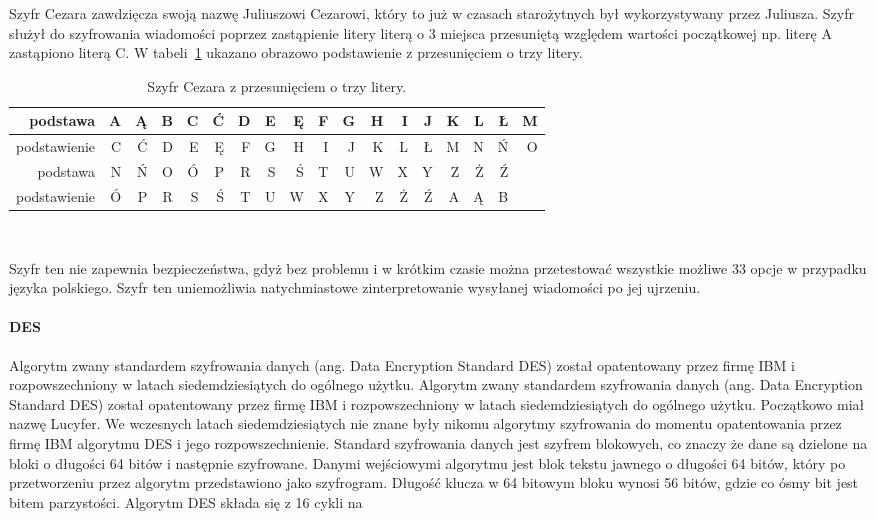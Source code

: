 \documentclass[12p]{article}
\begin{document}
Szyfr Cezara zawdzięcza swoją nazwę Juliuszowi Cezarowi, który to już w czasach starożytnych był wykorzystywany przez Juliusza. Szyfr służył do szyfrowania wiadomości poprzez zastąpienie litery literą o 3 miejsca przesuniętą względem wartości początkowej np. literę A zastąpiono literą C. W tabeli~\ref{cezar} ukazano obrazowo podstawienie z przesunięciem o trzy litery.

\begin{table}[!h]
\centering
\begin{tabular}{|r|r|r|r|r|r|r|r|r|r|r|r|r|r|r|r|r|r|}
\hline
podstawa & A & Ą & B & C & Ć & D & E & Ę & F & G & H & I & J & K & L & Ł & M \\
\hline 
\hline
podstawienie & C & Ć & D & E & Ę & F & G & H & I & J & K & L & Ł & M & N & Ń & O \\
\hline
\hline
podstawa & N & Ń & O & Ó & P & R & S & Ś & T & U & W & X & Y & Z & Ż & Ź & \\
\hline 
\hline
podstawienie & Ó & P & R & S & Ś & T & U & W & X & Y & Z & Ż & Ź & A & Ą & B & \\
\hline
\end{tabular}
\caption{Szyfr Cezara z przesunięciem o trzy litery.}~\label{cezar}
\end{table}

Szyfr ten nie zapewnia bezpieczeństwa, gdyż bez problemu i w krótkim czasie można przetestować wszystkie możliwe 33 opcje w przypadku języka polskiego. Szyfr ten uniemożliwia natychmiastowe zinterpretowanie wysyłanej wiadomości po jej ujrzeniu.

\paragraph{DES}
\quad Algorytm zwany standardem szyfrowania danych (ang. Data Encryption Standard DES) został opatentowany przez firmę IBM i rozpowszechniony w latach siedemdziesiątych do ogólnego użytku. 
\quad Algorytm zwany standardem szyfrowania danych (ang. Data Encryption Standard DES) został opatentowany przez firmę IBM i rozpowszechniony w latach siedemdziesiątych do ogólnego użytku. Początkowo miał nazwę Lucyfer. We wczesnych latach siedemdziesiątych nie znane były nikomu algorytmy szyfrowania do momentu opatentowania przez firmę IBM algorytmu DES i jego rozpowszechnienie.
Standard szyfrowania danych jest szyfrem blokowych, co znaczy że dane są dzielone na bloki o długości 64 bitów i następnie szyfrowane. Danymi wejściowymi algorytmu jest blok tekstu jawnego o długości 64 bitów, który po przetworzeniu przez algorytm przedstawiono jako szyfrogram. Długość klucza w 64 bitowym bloku wynosi 56 bitów, gdzie co ósmy bit jest bitem parzystości. Algorytm DES składa się z 16 cykli na
\end{document}
